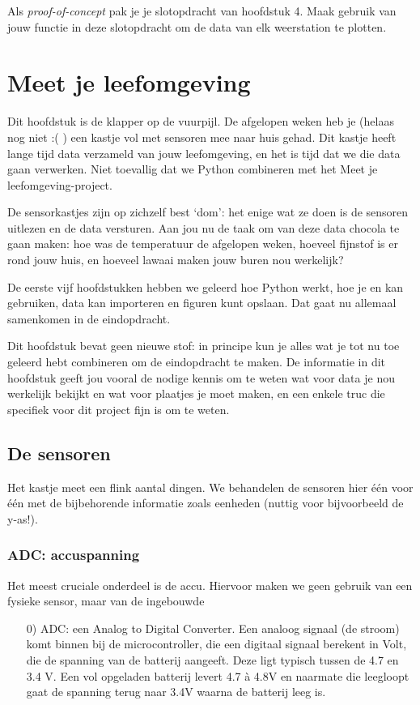 \documentclass[a4paper,11pt, fleqn]{article}
\newcommand{\ditwc}{Naam van het huidige werkcollege}
\begin{document}
\bigbreak
Als {\it proof-of-concept} pak je je slotopdracht van hoofdstuk 4. Maak gebruik van jouw functie in deze slotopdracht om de data van elk weerstation te plotten.


\clearpage
\renewcommand{\ditwc}{Meet je leefomgeving}
\section[Meet je leefomgeving]{\ditwc}
Dit hoofdstuk is de klapper op de vuurpijl. De afgelopen weken heb je (helaas nog niet :( ) een kastje vol met sensoren mee naar huis gehad. Dit kastje heeft lange tijd data verzameld van jouw leefomgeving, en het is tijd dat we die data gaan verwerken. Niet toevallig dat we Python combineren met het Meet je leefomgeving-project. 

De sensorkastjes zijn op zichzelf best `dom': het enige wat ze doen is de sensoren uitlezen en de data versturen. Aan jou nu de taak om van deze data chocola te gaan maken: hoe was de temperatuur de afgelopen weken, hoeveel fijnstof is er rond jouw huis, en hoeveel lawaai maken jouw buren nou werkelijk?

De eerste vijf hoofdstukken hebben we geleerd hoe Python werkt, hoe je  en  kan gebruiken, data kan importeren en figuren kunt opslaan. Dat gaat nu allemaal samenkomen in de eindopdracht.

Dit hoofdstuk bevat geen nieuwe stof: in principe kun je alles wat je tot nu toe geleerd hebt combineren om de eindopdracht te maken. De informatie in dit hoofdstuk geeft jou vooral de nodige kennis om te weten wat voor data je nou werkelijk bekijkt en wat voor plaatjes je moet maken, en een enkele truc die specifiek voor dit project fijn is om te weten.

\subsection{De sensoren}
Het kastje meet een flink aantal dingen. We behandelen de sensoren hier \'e\'en voor \'e\'en met de bijbehorende informatie zoals eenheden (nuttig voor bijvoorbeeld de y-as!).

\subsubsection{ADC: accuspanning}
Het meest cruciale onderdeel is de accu. Hiervoor maken we geen gebruik van een fysieke sensor, maar van de ingebouwde
\begin{itemize}
	\item[0)] ADC: een Analog to Digital Converter. Een analoog signaal (de stroom) komt binnen bij de microcontroller, die een digitaal signaal berekent in Volt, die de spanning van de batterij aangeeft. Deze ligt typisch tussen de 4.7 en 3.4 V. Een vol opgeladen batterij levert 4.7 \`a 4.8V en naarmate die leegloopt gaat de spanning terug naar 3.4V waarna de batterij leeg is.
\end{itemize}
\end{document}
